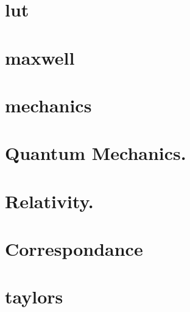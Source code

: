 \documentclass[12pt,leqno]{book}
\begin{document}
\part{lut}



\part{maxwell}


\part{mechanics}


\part{Quantum Mechanics.}















\part{Relativity.}





\part{Correspondance}


\part{taylors}




%





%
\end{document}
